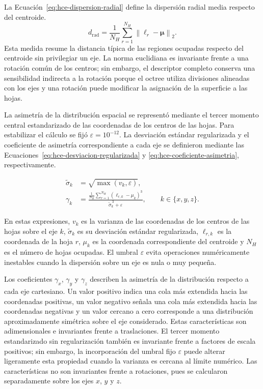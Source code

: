 La Ecuación~\eqref{eq:hce-dispersion-radial} define la dispersión radial media respecto del centroide.
\begin{equation}
d_{\mathrm{rad}}
=
\frac{1}{N_H}
\sum_{r=1}^{N_H}
\left\|
\boldsymbol{\ell}_r-\boldsymbol{\mu}
\right\|_2.
\label{eq:hce-dispersion-radial}
\end{equation}
Esta medida resume la distancia típica de las regiones ocupadas respecto del centroide sin privilegiar un eje. La norma euclidiana es invariante frente a una rotación común de los centros; sin embargo, el descriptor completo conserva una sensibilidad indirecta a la rotación porque el octree utiliza divisiones alineadas con los ejes y una rotación puede modificar la asignación de la superficie a las hojas.

La asimetría de la distribución espacial se representó mediante el
tercer momento central estandarizado de las coordenadas de los centros
de las hojas. Para estabilizar el cálculo se fijó
$\varepsilon=10^{-12}$. La desviación estándar regularizada y el
coeficiente de asimetría correspondiente a cada eje se definieron
mediante las Ecuaciones~\eqref{eq:hce-desviacion-regularizada} y
\eqref{eq:hce-coeficiente-asimetria}, respectivamente.

\begin{subequations}\label{eq:hce-asimetria}
\begin{align}
\widetilde{\sigma}_k
&=
\sqrt{\max(v_k,\varepsilon)},
\label{eq:hce-desviacion-regularizada}\\
\gamma_k
&=
\frac{
    \displaystyle
    \frac{1}{N_H}
    \sum_{r=1}^{N_H}
    \left(\ell_{r,k}-\mu_k\right)^3
}{
    \widetilde{\sigma}_k^{\,3}+\varepsilon
},
\qquad
k\in\{x,y,z\}.
\label{eq:hce-coeficiente-asimetria}
\end{align}
\end{subequations}

En estas expresiones, $v_k$ es la varianza de las coordenadas de los
centros de las hojas sobre el eje $k$,
$\widetilde{\sigma}_k$ es su desviación estándar regularizada,
$\ell_{r,k}$ es la coordenada de la hoja $r$, $\mu_k$ es la
coordenada correspondiente del centroide y $N_H$ es el número de
hojas ocupadas. El umbral $\varepsilon$ evita operaciones
numéricamente inestables cuando la dispersión sobre un eje es nula o
muy pequeña.

Los coeficientes $\gamma_x$, $\gamma_y$ y $\gamma_z$ describen la
asimetría de la distribución respecto a cada eje cartesiano. Un valor
positivo indica una cola más extendida hacia las coordenadas
positivas, un valor negativo señala una cola más extendida hacia las
coordenadas negativas y un valor cercano a cero corresponde a una
distribución aproximadamente simétrica sobre el eje considerado.
Estas características son adimensionales e invariantes frente a
traslaciones. El tercer momento estandarizado sin regularización
también es invariante frente a factores de escala positivos; sin
embargo, la incorporación del umbral fijo $\varepsilon$ puede alterar
ligeramente esta propiedad cuando la varianza es cercana al límite
numérico. Las características no son invariantes frente a rotaciones,
pues se calcularon separadamente sobre los ejes $x$, $y$ y $z$.

